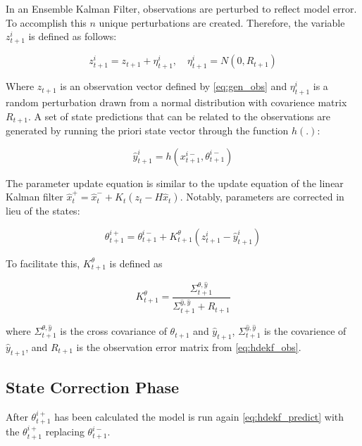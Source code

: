 In an Ensemble Kalman Filter, observations are perturbed to reflect model error. To accomplish this $n$ unique perturbations are created. Therefore, the variable $z_{t+1}^{i}$ is defined as follows:

\begin{equation}\label{eq:hdekf_obs}
z_{t+1}^{i} = z_{t+1} + \eta_{t+1}^{i},\quad \eta_{t+1}^{i} = N(0,R_{t+1})
\end{equation}

Where $z_{t+1}$ is an observation vector defined by \eqref{eq:gen_obs} and $\eta_{t+1}^{i}$ is a random perturbation drawn from a normal distribution with covarience matrix $R_{t+1}$. A set of state predictions that can be related to the observations are generated by running the priori state vector through the function $h(.)$:

\begin{equation}\label{eq:hdekf_pred}
\hat{y}_{t+1}^{i} = h(x_{t+1}^{i-}, \theta_{t+1}^{i-})
\end{equation}

The parameter update equation is similar to the update equation of the linear Kalman filter $\hat{x}^{+}_{t} = \hat{x}^{-}_{t} + K_{t}(z_{t}-H\hat{x}_{t})$. Notably,  parameters are corrected in lieu of the states:

\begin{equation}\label{eq:hdekf_param_update}
\theta_{t+1}^{i+} = \theta_{t+1}^{i-} + K_{t+1}^{\theta}(z_{t+1}^{i}-\hat{y}_{t+1}^{i})
\end{equation}

To facilitate this, $K_{t+1}^{\theta}$ is defined as

\begin{equation}\label{eq:hdekf_param_k}
K_{t+1}^{\theta} = \frac{\Sigma^{\theta,\hat{y}}_{t+1}}{\Sigma^{\hat{y},\hat{y}}_{t+1} + R_{t+1}}
\end{equation}

where $\Sigma^{\theta,\hat{y}}_{t+1}$ is the cross covariance of $\theta_{t+1}$ and $\hat{y}_{t+1}$, $\Sigma^{\hat{y},\hat{y}}_{t+1}$ is the covarience of $\hat{y}_{t+1}$, and $R_{t+1}$ is the observation error matrix from \eqref{eq:hdekf_obs}. 

\subsection{State Correction Phase}

After $\theta_{t+1}^{i+}$ has been calculated the model is run again \eqref{eq:hdekf_predict} with the $\theta_{t+1}^{i+}$ replacing $\theta_{t+1}^{i-}$.

